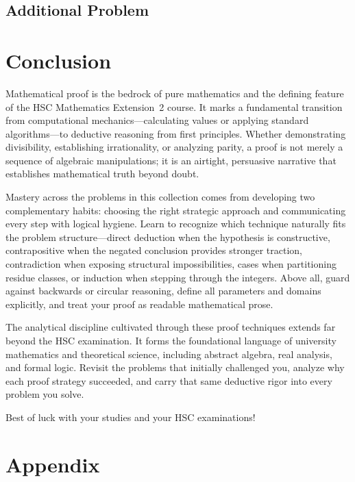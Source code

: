 \documentclass[12pt]{article}
\begin{document}
\newpage

\subsection*{Additional Problem}



\newpage

\section{Conclusion}

Mathematical proof is the bedrock of pure mathematics and the defining feature of the HSC Mathematics Extension~2 course. It marks a fundamental transition from computational mechanics---calculating values or applying standard algorithms---to deductive reasoning from first principles. Whether demonstrating divisibility, establishing irrationality, or analyzing parity, a proof is not merely a sequence of algebraic manipulations; it is an airtight, persuasive narrative that establishes mathematical truth beyond doubt.

Mastery across the problems in this collection comes from developing two complementary habits: choosing the right strategic approach and communicating every step with logical hygiene. Learn to recognize which technique naturally fits the problem structure---direct deduction when the hypothesis is constructive, contrapositive when the negated conclusion provides stronger traction, contradiction when exposing structural impossibilities, cases when partitioning residue classes, or induction when stepping through the integers. Above all, guard against backwards or circular reasoning, define all parameters and domains explicitly, and treat your proof as readable mathematical prose.

The analytical discipline cultivated through these proof techniques extends far beyond the HSC examination. It forms the foundational language of university mathematics and theoretical science, including abstract algebra, real analysis, and formal logic. Revisit the problems that initially challenged you, analyze why each proof strategy succeeded, and carry that same deductive rigor into every problem you solve.

Best of luck with your studies and your HSC examinations!

\newpage

\section{Appendix}
\end{document}
